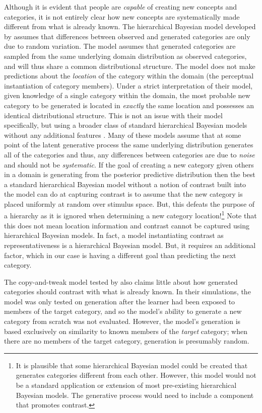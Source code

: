 \documentclass[12pt]{article}
\begin{document}
\begin{flushleft}
Although it is evident that people are {\em capable} of creating new concepts
and categories, it is not entirely clear how new concepts are systematically
made different from what is already known. The hierarchical Bayesian model
developed by \cite{jern2013probabilistic} assumes that differences between
observed and generated categories are only due to random variation. The model
assumes that generated categories are sampled from the same underlying domain
distribution as observed categories, and will thus share a common distributional
structure. The model does not make predictions about the {\em location} of the
category within the domain (the perceptual instantiation of category members).
Under a strict interpretation of their model, given knowledge of a single
category within the domain, the most probable new category to be generated is
located in {\em exactly} the same location and possesses an identical
distributional structure. This is not an issue with their model specifically,
but using a broader class of standard hierarchical Bayesian models without any additional features \citep[e.g.,
][]{griffithsscn07,kemp07}. Many of these models assume that at some point of
the latent generative process the same underlying distribution generates all of
the categories and thus, any differences between categories are due to {\em
noise} and should not be {\em systematic}. If the goal of creating a new
category given others in a domain is generating from the posterior predictive
distribution then the best a standard hierarchical Bayesian model without a
notion of contrast built into the model can do at capturing contrast is to
assume that the new category is placed uniformly at random over stimulus space.
But, this defeats the purpose of a hierarchy as it is ignored when determining a
new category location!\footnote{It is plausible that some hierarchical Bayesian
model could be created that generates categories different from each other.
However, this model would not be a standard application or extension of most
pre-existing hierarchical Bayesian models. The generative process would need to
include a component that promotes contrast.} Note that this does not mean
location information and contrast cannot be captured using hierarchical Bayesian
models. In fact, a model instantiating contrast as representativeness is a hierarchical
Bayesian model. But, it requires an additional factor, which in our case is having a different goal than predicting the next category.

The copy-and-tweak model tested by \cite{jern2013probabilistic} also claims
little about how generated categories should contrast with what is already
known. In their simulations, the model was only tested on generation after the
learner had been exposed to members of the target category, and so the model's
ability to generate a new category from scratch was not evaluated. However, the
model's generation is based exclusively on similarity to known members of the
{\em target} category; when there are no members of the target category,
generation is presumably random.





\end{flushleft}
\end{document}
